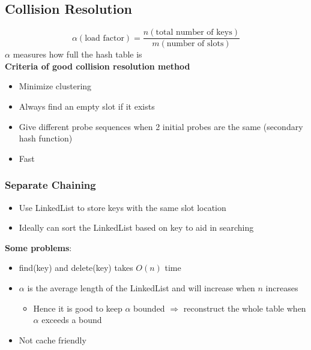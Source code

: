 \documentclass{article}
\begin{document}
\begin{multicols}{2}
\subsection{Collision Resolution}
$$\alpha(\text{load factor}) = \frac{n (\text{total number of keys})}{m (\text{number of slots})}$$
$\alpha$ measures how full the hash table is\vspace{0.5em}\\
\textbf{Criteria of good collision resolution method}
\begin{itemize}
	\item Minimize clustering
	\item Always find an empty slot if it exists
	\item Give different probe sequences when 2 initial probes are the same (secondary hash function)
	\item Fast
\end{itemize}
\subsubsection{Separate Chaining}
\begin{itemize}
	\item Use LinkedList to store keys with the same slot location
	\item Ideally can sort the LinkedList based on key to aid in searching
\end{itemize}
\textbf{Some problems}:
\begin{itemize}
	\item find(key) and delete(key) takes $O(n)$ time
	\item $\alpha$ is the average length of the LinkedList and will increase when $n$ increases
	\begin{itemize}
		\item Hence it is good to keep $\alpha$ bounded $\Rightarrow$ reconstruct the whole table when $\alpha$ exceeds a bound
	\end{itemize}
	\item Not cache friendly
\end{itemize}

\end{multicols}
\end{document}
